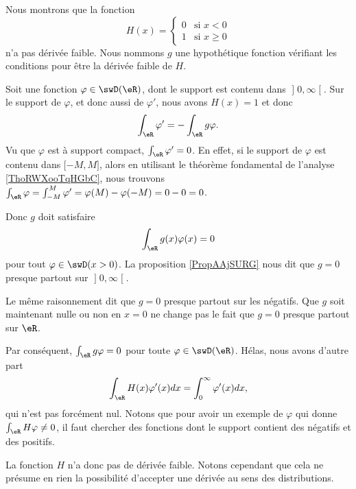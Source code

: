 \begin{example}     \label{EXooRVGHooTWOCtF}
    Nous montrons que la fonction
    \begin{equation}
        H(x)=\begin{cases}
            0    &   \text{si } x<0\\
            1    &    \text{si } x\geq 0
        \end{cases}
    \end{equation}
    n'a pas dérivée faible. Nous nommons \( g\) une hypothétique fonction vérifiant les conditions pour être la dérivée faible de \( H\).

    Soit une fonction \( \varphi\in\swD(\eR)\), dont le support est contenu dans \( \mathopen] 0 , \infty \mathclose[\). Sur le support de \( \varphi\), et donc aussi de \( \varphi'\), nous avons \( H(x)=1\) et donc
        \begin{equation}
            \int_{\eR}\varphi'=-\int_{\eR}g\varphi.
        \end{equation}
        Vu que \( \varphi\) est à support compact, \( \int_{\eR}\varphi'=0\). En effet, si le support de \( \varphi\) est contenu dans \( \mathopen[ -M , M \mathclose]\), alors en utilisant le théorème fondamental de l'analyse \ref{ThoRWXooTqHGbC}, nous trouvons \( \int_{\eR}\varphi=\int_{-M}^M\varphi'=\varphi(M)-\varphi(-M)=0-0=0\).

        Donc \( g\) doit satisfaire
        \begin{equation}
            \int_{\eR}g(x)\varphi(x)=0
        \end{equation}
    pour tout \( \varphi\in\swD(x>0)\). La proposition \ref{PropAAjSURG} nous dit que \( g=0\) presque partout sur \( \mathopen] 0 , \infty \mathclose[\).

        Le même raisonnement dit que \( g=0\) presque partout sur les négatifs. Que \( g\) soit maintenant nulle ou non en \( x=0\) ne change pas le fait que \( g=0\) presque partout sur \( \eR\).

        Par conséquent, \( \int_{\eR}g\varphi=0\) pour toute \( \varphi\in \swD(\eR)\). Hélas, nous avons d'autre part
        \begin{equation}
            \int_{\eR}H(x)\varphi'(x)dx=\int_0^{\infty}\varphi'(x)dx,
        \end{equation}
        qui n'est pas forcément nul. Notons que pour avoir un exemple de \( \varphi\) qui donne \( \int_{\eR}H\varphi\neq 0\), il faut chercher des fonctions dont le support contient des négatifs et des positifs.

        La fonction \( H\) n'a donc pas de dérivée faible. Notons cependant que cela ne présume en rien la possibilité d'accepter une dérivée au sens des distributions.
\end{example}

